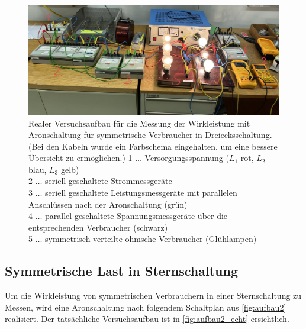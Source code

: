\documentclass[12pt,english,ngerman]{scrartcl}
\begin{document}
\begin{figure}[H]
	\begin{center}
		\includegraphics[width = \textwidth]{./figures/aufbau1_echt.png}
	\end{center}
	\caption[Realer Versuchsaufbau für die Messung der Wirkleistung mit Aronschaltung für symmetrische
	Verbraucher in Dreiecksschaltung]
	{Realer Versuchsaufbau für die Messung der Wirkleistung mit Aronschaltung für symmetrische
	Verbraucher in Dreiecksschaltung. (Bei den Kabeln wurde ein Farbschema eingehalten, um eine bessere Übersicht zu ermöglichen.) 
	1 \(\dots\) Versorgungsspannung ($L_1$ rot, $L_2$ blau, $L_3$ gelb) \\
	2 \(\dots\) seriell geschaltete Strommessgeräte  \\
	3 \(\dots\) seriell geschaltete Leistungsmessgeräte mit parallelen Anschlüssen nach der Aronschaltung (grün)\\
	4 \(\dots\) parallel geschaltete Spannungsmessgeräte über die entsprechenden Verbraucher (schwarz)\\
	5 \(\dots\) symmetrisch verteilte ohmsche Verbraucher (Glühlampen)}
	\label{fig:aufbau1_echt}
\end{figure}

\subsection{Symmetrische Last in Sternschaltung}

Um die Wirkleistung von symmetrischen Verbrauchern in einer Sternschaltung zu Messen, wird eine Aronschaltung
nach folgendem Schaltplan aus \autoref{fig:aufbau2} realisiert. 
Der tatsächliche Versuchsaufbau ist in \autoref{fig:aufbau2_echt} ersichtlich.
\end{document}
